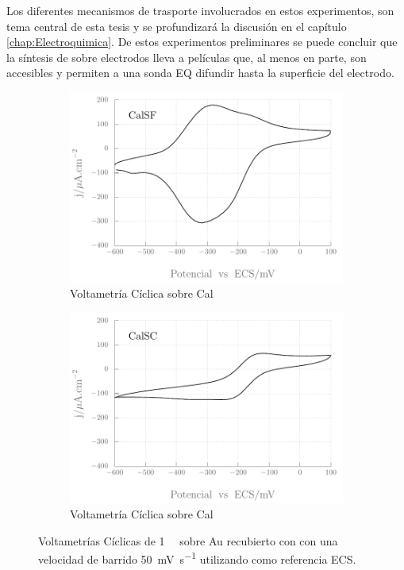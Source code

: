 			Los diferentes mecanismos de trasporte involucrados en estos experimentos, son tema central de esta tesis y se profundizará la discusión en el capítulo \ref{chap:Electroquimica}. De estos experimentos preliminares se puede concluir que la síntesis de \pdm\space sobre electrodos lleva a películas que, al menos en parte, son accesibles y permiten a una sonda EQ difundir hasta la superficie del electrodo.   

						\begin{figure}[th]
				 	   	    \begin{subfigure}[t]{0.495\textwidth}
				        	\includegraphics[width=\textwidth]{Graficos/SF-accesibilidad.pdf}
				       		\caption{Voltametría Cíclica sobre Cal\pdmF}
				         	\end{subfigure}
				         	\begin{subfigure}[t]{0.495\textwidth}
				        	\includegraphics[width=\textwidth]{Graficos/SC-accesibilidad.pdf}
				       		\caption{Voltametría Cíclica sobre Cal\pdmC}
				         	\end{subfigure}
				     		\caption[Accesibilidad electrodo de trabajo.]{Voltametrías Cíclicas de \aminorutenio\space \SI{1}{\milli\Molar} sobre Au recubierto con \pdm\space con una velocidad de barrido \SI{50}{\milli\volt\per\second} utilizando como referencia ECS.}
				     		\label{fig:accesibilidad}
				     		\end{figure}
	
